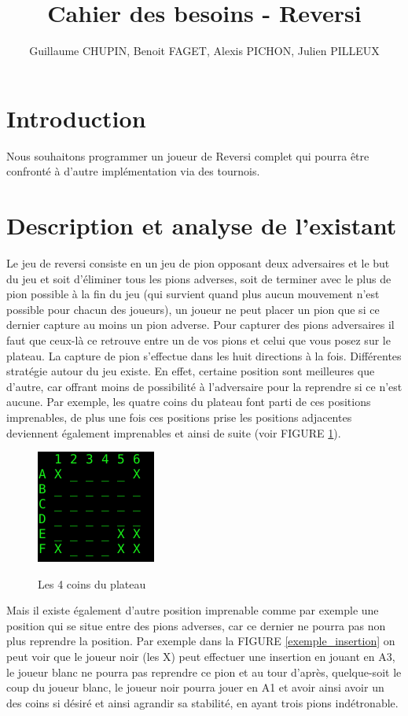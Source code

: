 \documentclass[10pt, a4paper]{article}
\title {Cahier des besoins - Reversi}
\author {Guillaume CHUPIN, Benoit FAGET, Alexis PICHON, Julien PILLEUX}
\begin{document}
\maketitle
\thispagestyle {empty}
\newpage
\tableofcontents
\newpage

\section {Introduction}
Nous souhaitons programmer un joueur de Reversi complet qui pourra être confronté à d'autre implémentation via des tournois.

\section {Description et analyse de l'existant}
Le jeu de reversi consiste en un jeu de pion opposant deux adversaires et le but du jeu et soit d'éliminer tous les pions adverses, soit de terminer avec le plus de pion possible à la fin du jeu (qui survient quand plus aucun mouvement n'est possible pour chacun des joueurs), un joueur ne peut placer un pion que si ce dernier capture au moins un pion adverse. Pour capturer des pions adversaires il faut que ceux-là ce retrouve entre un de vos pions et celui que vous posez sur le plateau. La capture de pion s'effectue dans les huit directions à la fois.\newline
Différentes stratégie autour du jeu existe. En effet, certaine position sont meilleures que d'autre, car offrant moins de possibilité à l'adversaire pour la reprendre si ce n'est aucune. Par exemple, les quatre coins du plateau font parti de ces positions imprenables, de plus une fois ces positions prise les positions adjacentes deviennent également imprenables et ainsi de suite (voir FIGURE \ref{bord_stable}).
\begin {figure}[H]
  \centering
  \includegraphics [scale = 0.5]{images/bord_stable.png}
  \label {bord_stable}
  \caption {Les 4 coins du plateau}
\end {figure}
Mais il existe également d'autre position imprenable comme par exemple une position qui se situe entre des pions adverses, car ce dernier ne pourra pas non plus reprendre la position. Par exemple dans la FIGURE \ref{exemple_insertion} on peut voir que le joueur noir (les X) peut effectuer une insertion en jouant en A3, le joueur blanc ne pourra pas reprendre ce pion et au tour d'après, quelque-soit le coup du joueur blanc, le joueur noir pourra jouer en A1 et avoir ainsi avoir un des coins si désiré et ainsi agrandir sa stabilité, en ayant trois pions indétronable.
\end{document}
